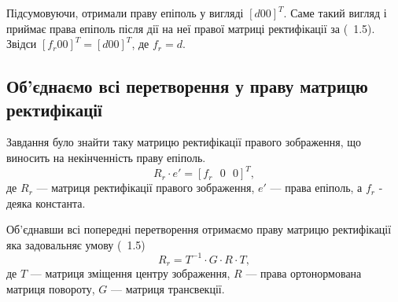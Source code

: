 Підсумовуючи, отримали праву епіполь у вигляді ${[d 0 0]}^T$. Саме такий 
вигляд і приймає права епіполь після дії на неї правої матриці ректифікації
за (~1.5). Звідси ${[f_r 0 0]}^T = {[d 0 0]}^T$, де $f_r = d$.


\subsection{Об'єднаємо всі перетворення у праву матрицю ректифікації}
Завдання було знайти таку матрицю ректифікації правого зображення, що 
виносить на некінченність праву епіполь. 
\begin{equation}
	R_r \cdot e' = {[f_r \:\:\: 0 \:\:\: 0]}^T,
\end{equation}
де $R_r$ --- матриця ректифікації правого зображення, $e'$ --- права епіполь, а 
$f_r$ - деяка константа.

Об'єднавши всі попередні перетворення отримаємо праву матрицю ректифікації яка 
задовальняє умову (~1.5)
\begin{equation}
	R_r = T^{-1} \cdot G \cdot R \cdot T,
\end{equation}
де $T$ --- матриця зміщення центру зображення, $R$ --- права ортонормована
матриця повороту, $G$ --- матриця трансвекції.

